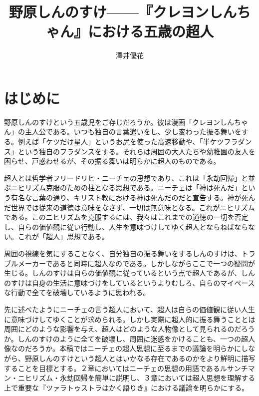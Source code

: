 \documentclass[b5j,twoside,twocolumn]{utarticle}
\title{\tbaselineshift =4.0pt 野原しんのすけ------『クレヨンしんちゃん』における五歳の超人}
\author{澤井優花}
\date{\vspace{-5mm}}
\makeatletter
\def\yakuchu{%
\@ifnextchar[\@xfootnote %
{\stepcounter{yakuchu}%
\protected@xdef\@thefnmark{\theyakuchu}%
\@footnotemark\@footnotetext}}
\makeatother
\begin{document}
\maketitle

\setlength{\footskip}{-2mm}
\chead[]{}
\lfoot[]{\thepage{}}
\cfoot[]{}
\rfoot[\thepage{}]{}

\let\yakuchu=\endnote
\renewcommand{\footnoterule}{\noindent\rule{100mm}{0.3mm}\vskip2mm}
\thispagestyle{fancy}
\section{はじめに}
野原しんのすけという五歳児をご存じだろうか。彼は漫画「クレヨンしんちゃん」の主人公である。いつも独自の言葉遣いをし、少し変わった振る舞いをする。例えば「ケツだけ星人」というお尻を使った高速移動や、「半ケツフラダンス」という独自のフラダンスをする。それらは周囲の大人たちや幼稚園の友人を困らせ、戸惑わせるが、その振る舞いは明らかに超人のものである。


超人とは哲学者フリードリヒ・ニーチェの思想であり、これは「永劫回帰」と並ぶニヒリズム克服のための柱となる思想である。ニーチェは「神は死んだ」という有名な言葉の通り、キリスト教における神は死んだのだと宣告する。神が死んだ世界では従来の道徳は意味をなさず、一切は無意味となる。これがニヒリズムである。このニヒリズムを克服するには、我々はこれまでの道徳の一切を否定し、自らの価値観に従い行動し、人生を意味づけしてゆく超人とならねばならない。これが「超人」思想である。


周囲の視線を気にすることなく、自分独自の振る舞いをするしんのすけは、トラブルメーカーであると同時に超人なのである。しかしながらここで一つの疑問が生じる。しんのすけは自らの価値観に従っているという点で超人であるが、しんのすけは自身の生活に意味づけをしているというよりむしろ、自らのマイペースな行動で全てを破壊しているように思われる。


先に述べたようにニーチェの言う超人において、超人は自らの価値観に従い人生に意味づけしてゆくことが求められる。しかし実際に超人的に振る舞うこととは周囲にどのような影響を与え、超人はどのような人物像として見られるのだろうか。しんのすけのように全てを破壊し、周囲に迷惑をかけることも、一つの超人像なのだろうか。本稿ではニーチェの超人思想に至るまでの議論を明らかにしながら、野原しんのすけという超人とはいかなる存在であるのかをより鮮明に描写することを目標とする。２章においてはニーチェの思想の用語であるルサンチマン・ニヒリズム・永劫回帰を簡単に説明し、３章においては超人思想を理解する上で重要な『ツァラトゥストラはかく語りき』における議論を明らかにする。
\end{document}

